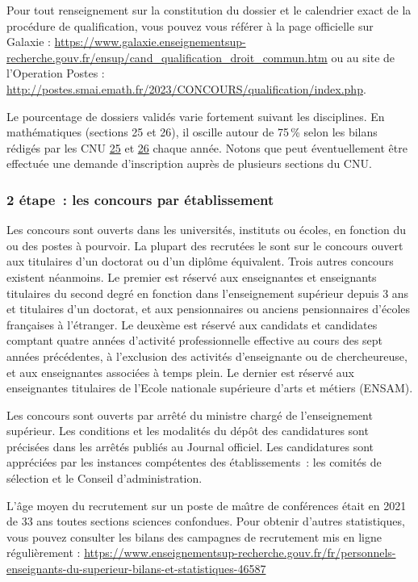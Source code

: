 Pour tout renseignement sur la constitution du dossier et le calendrier exact de la proc\'edure de qualification, 
vous pouvez vous r\'ef\'erer \`a la page officielle sur Galaxie : \url{https://www.galaxie.enseignementsup-recherche.gouv.fr/ensup/cand_qualification_droit_commun.htm} ou au site de l'Operation Postes : \url{http://postes.smai.emath.fr/2023/CONCOURS/qualification/index.php}.

Le pourcentage de dossiers valid\'es
varie fortement suivant les disciplines. En math\'ematiques
(sections 25 et 26), il oscille autour de 75\,\% selon les bilans r\'edig\'es par les CNU 
\href{http://cnu25.emath.fr/}{25} et \href{http://cnu26.emath.fr/}{26} chaque ann\'ee. Notons que peut
\'eventuellement \^etre effectu\'ee
une demande d'inscription aupr\`es de plusieurs sections du CNU.

\subsubsection*{2\ieme{} \'etape~: les concours par \'etablissement}

Les concours sont ouverts dans les universit\'es, instituts ou
\'ecoles, en fonction du ou des postes \`a pourvoir. La plupart des
recrut\'e\mp e\mp s le sont sur le concours ouvert aux titulaires d'un
doctorat ou d'un dipl\^ome \'equivalent. Trois autres concours
existent n\'eanmoins. Le premier est r\'eserv\'e aux enseignantes et enseignants
titulaires du second degr\'e en fonction dans l'enseignement
sup\'erieur depuis 3 ans et titulaires d'un doctorat, et aux
pensionnaires ou anciens pensionnaires d'\'ecoles fran\c{c}aises \`a
l'\'etranger. Le deux\`eme est r\'eserv\'e aux candidats et candidates comptant
quatre ann\'ees d'activit\'e professionnelle effective au cours des
sept ann\'ees pr\'ec\'edentes, \`a l'exclusion des activit\'es
d'enseignant\mp e ou de chercheur\mp euse, et aux enseignant\mp e\mp s associ\'e\mp e\mp s \`a
temps plein.
Le dernier est r\'eserv\'e aux enseignant\mp e\mp s titulaires de l'Ecole nationale sup\'erieure d'arts et m\'etiers (ENSAM).

Les concours sont ouverts par arr\^et\'e du ministre charg\'e de
l'enseignement sup\'erieur. Les conditions et les modalit\'es du
d\'ep\^ot des candidatures sont pr\'ecis\'ees dans les arr\^et\'es
publi\'es au Journal officiel. Les candidatures sont
appr\'eci\'ees par les instances comp\'etentes des
\'etablissements~:
les comit\'es de s\'election et le Conseil d'administration.

L'\^age moyen du recrutement sur un poste de ma\^\i  tre de
conf\'erences \'etait en 2021 de 33 ans toutes sections sciences confondues. Pour obtenir d'autres statistiques, vous pouvez consulter les bilans des campagnes de recrutement mis en ligne r\'e\-gu\-li\`erement :
{\url{https://www.enseignementsup-recherche.gouv.fr/fr/personnels-enseignants-du-superieur-bilans-et-statistiques-46587}}

